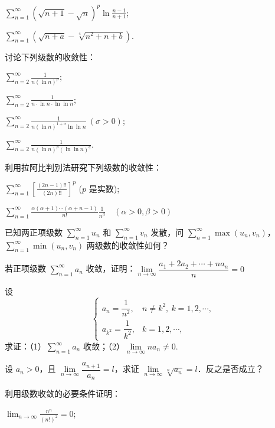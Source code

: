 \begin{xiti}
\begin{ziti}
\item $\displaystyle\sum_{n=1}^{\infty}\left(\sqrt{n+1}-\sqrt{n}\right)^{p}\ln\frac{n-1}{n+1}$;
\item $\displaystyle\sum_{n=1}^{\infty}\left(\sqrt{n+a}-\sqrt[4]{n^{2}+n+b}\right)$.
\end{ziti}
\item 讨论下列级数的收敛性：
\begin{ziti}
\item $\displaystyle\sum_{n=2}^{\infty}\frac{1}{n(\ln n)^{p}}$;
\item $\displaystyle\sum_{n=2}^{\infty}\frac{1}{n\cdot\ln n\cdot\ln\ln n}$;
\item $\displaystyle\sum_{n=2}^{\infty}\frac{1}{n(\ln n)^{1+\sigma}\ln\ln n}\ (\sigma>0)$;
\item $\displaystyle\sum_{n=2}^{\infty}\frac{1}{n(\ln n)^{p}(\ln\ln n)^{q}}.$
\end{ziti}
\item 利用拉阿比判别法研究下列级数的收敛性：
\begin{ziti}
\item $\displaystyle\sum_{n=1}^{\infty}\left[\frac{(2n-1)!!}{(2n)!!}\right]^{p}$ ($p$ 是实数);
\item $\displaystyle\sum_{n=1}^{\infty}\frac{\alpha(\alpha+1)\cdots(\alpha+n-1)}{n!}\frac{1}{n^{\beta}}\quad(\alpha>0,\beta>0)$
\end{ziti}
\item 已知两正项级数 $\displaystyle\sum_{n=1}^{\infty}u_{n}$ 和 $\sum_{n=1}^{\infty}v_{n}$ 发散，问 $\sum_{n=1}^{\infty}\max(u_{n},v_{n})$，$\sum_{n=1}^{\infty}\min(u_{n},v_{n})$ 两级数的收敛性如何？
\item 若正项级数 $\displaystyle\sum_{n=1}^{\infty}a_{n}$ 收敛，证明：$\lim\limits_{n\to\infty}\dfrac{a_{1}+2a_{2}+\cdots+na_{n}}{n}=0$
\item 设
\[
\begin{cases}
a_{n}=\dfrac{1}{n^{2}}, & n\neq k^{2},\ k=1,2,\cdots,\\[6pt]
a_{k^{2}}=\dfrac{1}{k^{2}}, & k=1,2,\cdots,
\end{cases}
\]
求证：（1）$\displaystyle\sum_{n=1}^{\infty}a_{n}$ 收敛；（2）$\lim\limits_{n\to\infty}na_{n}\neq0$.
\item 设 $a_n>0$，且 $\lim\limits_{n\to\infty}\dfrac{a_{n+1}}{a_n}=l$，求证 $\lim\limits_{n\to\infty}\sqrt[n]{a_n}=l$．反之是否成立？
\item 利用级数收敛的必要条件证明：
\begin{ziti}
\item $\displaystyle\lim_{n\to\infty}\frac{n^n}{(n!)^2}=0$;

\end{ziti}
\end{xiti}
